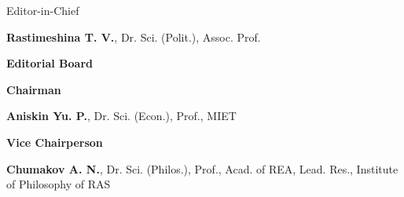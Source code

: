 
\begin{otherlanguage}{english}


\vspace*{-2em}
\begin{center}
    \small
    Editor-in-Chief

    \textbf{Rastimeshina T. V.}, {Dr. Sci. (Polit.), Assoc. Prof.}
\end{center}

\noindent
\begin{minipage}[t]{.48\textwidth}
    \begin{flushleft}
        \footnotesize
\begin{center}
\textbf{Editorial Board}
\end{center}

\textbf{Chairman}

\textbf{Aniskin Yu. P.}, Dr. Sci. (Econ.), Prof., MIET

\vspace{1em}
\textbf{Vice Chairperson}

\textbf{Chumakov A. N.}, Dr. Sci. (Philos.), Prof., Acad. of REA,
Lead. Res., Institute of Philosophy of RAS


\end{flushleft}
\end{minipage}
\end{otherlanguage}
